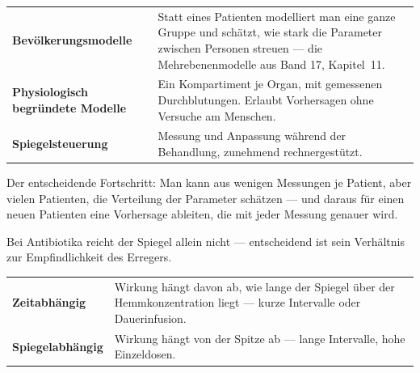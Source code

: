 \begin{forschung}
\begin{center}
{\small
\renewcommand{\arraystretch}{1.45}
\begin{tabular}{@{}P{2.8cm}P{5.4cm}@{}}
\toprule
\textbf{Bevölkerungs\-modelle} & Statt eines Patienten modelliert man eine ganze Gruppe und schätzt, wie stark die Parameter zwischen Personen streuen --- die Mehrebenenmodelle aus Band 17, Kapitel~11.\\
\textbf{Physiologisch begründete Modelle} & Ein Kompartiment je Organ, mit gemessenen Durchblutungen. Erlaubt Vorhersagen ohne Versuche am Menschen.\\
\textbf{Spiegelsteuerung} & Messung und Anpassung während der Behandlung, zunehmend rechnergestützt.\\
\bottomrule
\end{tabular}}
\end{center}

Der entscheidende Fortschritt: Man kann aus wenigen Messungen je Patient, aber vielen Patienten, die Verteilung der Parameter schätzen --- und daraus für einen neuen Patienten eine Vorhersage ableiten, die mit jeder Messung genauer wird.

\begin{center}
\begin{minipage}{0.88\textwidth}
\end{minipage}
\end{center}

Bei Antibiotika reicht der Spiegel allein nicht --- entscheidend ist sein Verhältnis zur Empfindlichkeit des Erregers.

\begin{center}
{\small
\renewcommand{\arraystretch}{1.45}
\begin{tabular}{@{}P{3.0cm}P{5.2cm}@{}}
\toprule
\textbf{Zeitabhängig} & Wirkung hängt davon ab, wie lange der Spiegel über der Hemmkonzentration liegt --- kurze Intervalle oder Dauerinfusion.\\
\textbf{Spiegel\-abhängig} & Wirkung hängt von der Spitze ab --- lange Intervalle, hohe Einzeldosen.\\
\bottomrule
\end{tabular}}
\end{center}

\begin{center}
\begin{minipage}{0.88\textwidth}
\end{minipage}
\end{center}
\end{forschung}

